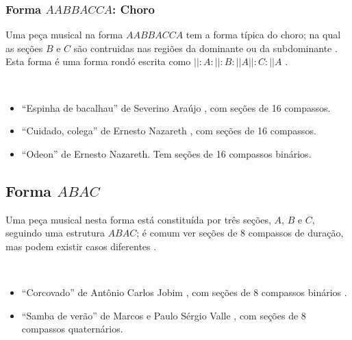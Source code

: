 \subsubsection{Forma $AABBACCA$: Choro}
\label{subsec:formachoro}
Uma peça musical na forma $AABBACCA$ tem a forma típica do choro;
na qual as seções $B$ e $C$ são contruidas nas regiões da dominante ou da subdominante 
\cite[pp. 83]{colluraimprovisacao}.
Esta forma é uma forma rondó escrita como  $||:A:||:B:||A||:C:||A$ \cite[pp. 53]{diniz2003almanaque}.
\begin{example} ~
\begin{itemize}
\item ``Espinha de bacalhau''  de Severino Araújo \cite[pp. 83]{colluraimprovisacao},
com seções de 16 compassos.
\item ``Cuidado, colega''  de Ernesto Nazareth \cite[pp. 83]{colluraimprovisacao},
com seções de 16 compassos.
\item ``Odeon'' de Ernesto Nazareth. Tem seções de 16 compassos binários.
\end{itemize}
\end{example}



\subsection{Forma $ABAC$}
\label{subsec:formaabac}
Uma peça musical nesta forma está constituída por três seções, $A$, $B$ e $C$,
seguindo uma estrutura $ABAC$; 
é comum ver seções de 8 compassos de duração, mas podem existir casos diferentes
\cite[pp. 53]{colluraimprovisacao}.
\begin{example} ~
\begin{itemize}
\item ``Corcovado''  de Antônio Carlos Jobim \cite[pp. 53]{colluraimprovisacao},
com seções de 8 compassos binários \cite{partituracorcovado1}.
\item ``Samba de verão'' de Marcos e Paulo Sérgio Valle  \cite[pp. 53]{colluraimprovisacao},
com seções de 8 compassos quaternários.
\end{itemize}
\end{example}


